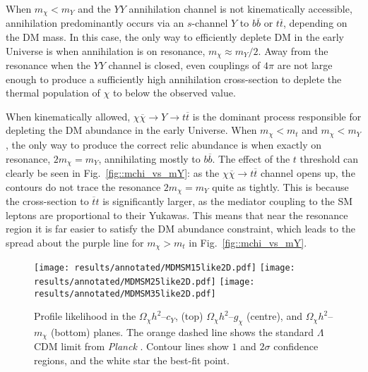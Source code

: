 \documentclass[pdftex,twocolumn,epjc3_preprint,runningheads]{svjour3}
\renewcommand{\_}{\discretionary{\underscore}{}{\underscore}}
\begin{document}
When $m_\chi < m_Y$ and the $YY$ annihilation channel is not kinematically accessible, annihilation predominantly occurs via an $s$-channel $Y$ to $b\overline{b}$ or $t\overline{t}$, depending on the DM mass.  In this case, the only way to efficiently deplete DM in the early Universe is when annihilation is on resonance, $m_\chi \approx m_Y/2$. Away from the resonance when the $YY$ channel is closed, even couplings of $4\pi$ are not large enough to produce a sufficiently high annihilation cross-section to deplete the thermal population of $\chi$ to below the observed value.

When kinematically allowed, $\chi\overline{\chi} \rightarrow Y \rightarrow t\overline{t}$ is the dominant process responsible for depleting the DM abundance in the early Universe. When $m_\chi < m_t$ and $m_\chi < m_Y$, the only way to produce the correct relic abundance is when exactly on resonance, $2m_\chi = m_Y$, annihilating mostly to $b\overline{b}$. The effect of the $t$ threshold can clearly be seen in Fig.~\ref{fig::mchi_vs_mY}: as the $\chi\overline{\chi}\rightarrow t\overline{t}$ channel opens up, the contours do not trace the resonance $2m_\chi = m_Y$ quite as tightly. This is because the cross-section to $\overline{t}t$ is significantly larger, as the mediator coupling to the SM leptons are proportional to their Yukawas. This means that near the resonance region it is far easier to satisfy the DM abundance constraint, which leads to the spread about the purple line for $m_\chi > m_t$ in Fig.~\ref{fig::mchi_vs_mY}.

\begin{figure}[tbp]
  \centering
  \texttt{[image: results/annotated/MDMSM\_1\_5\_like2D.pdf]}
  \texttt{[image: results/annotated/MDMSM\_2\_5\_like2D.pdf]}
  \texttt{[image: results/annotated/MDMSM\_3\_5\_like2D.pdf]}
  \vspace{-2mm}
  \caption{Profile likelihood in the $\Omega_\chi h^2$--$c_Y$, (top) $\Omega_\chi h^2$--$g_\chi$ (centre), and $\Omega_\chi h^2$--$m_\chi$ (bottom) planes. The orange dashed line shows the standard $\Lambda$CDM limit from \emph{Planck} \cite{Ade:2015xua}. Contour lines show $1$ and $2\sigma$ confidence regions, and the white star the best-fit point.}
  \label{fig::relic_densities}
\end{figure}
\end{document}
